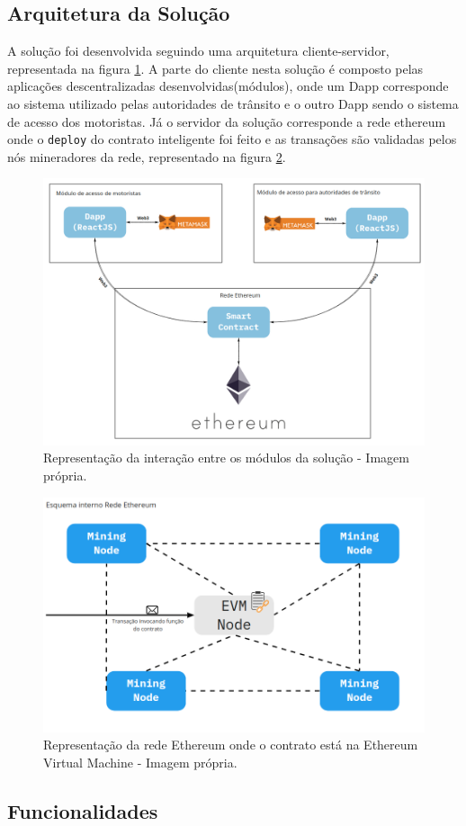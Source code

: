 \subsection{Arquitetura da Solução}

A solução foi desenvolvida seguindo uma arquitetura cliente-servidor, representada na figura \ref{fig:dapp_arquitetura_solucao}. A parte do cliente nesta solução é composto pelas aplicações descentralizadas desenvolvidas(módulos), onde um Dapp corresponde ao sistema utilizado pelas autoridades de trânsito e o outro Dapp sendo o sistema de acesso dos motoristas. Já o servidor da solução corresponde a rede ethereum onde o \verb|deploy| do contrato inteligente foi feito e as transações são validadas pelos nós mineradores da rede, representado na figura \ref{fig:dapp_rede_ethereum}.

    \begin{figure}[h]
         \centering
         \includegraphics[scale=0.35]{figuras/capitulo_5/arquitetura_solucao.png}
         \caption{Representação da interação entre os módulos da solução - Imagem própria.}
         \label{fig:dapp_arquitetura_solucao}
    \end{figure}
    
    \begin{figure}[h]
         \centering
         \includegraphics[scale=0.4]{figuras/capitulo_5/esquema_rede_ethereum.png}
         \caption{Representação da rede Ethereum onde o contrato está na Ethereum Virtual Machine - Imagem própria.}
         \label{fig:dapp_rede_ethereum}
    \end{figure}

\subsection{Funcionalidades}
